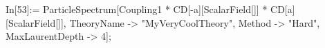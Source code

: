 In[53]:= ParticleSpectrum[Coupling1 * CD[-a][ScalarField[]] * CD[a][ScalarField[]], TheoryName -> "MyVeryCoolTheory", Method -> "Hard", MaxLaurentDepth -> 4]; 